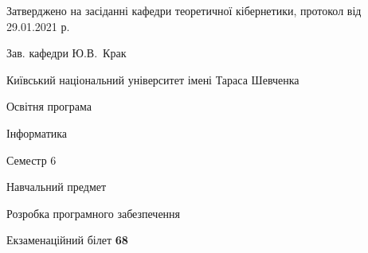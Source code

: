 \documentclass[10pt, ukrainian]{article}
\begin{document}
{\vspace{5mm}\smallskip \begin {small} Затверджено на засіданні кафедри теоретичної кібернетики, протокол  від   29.01.2021 р.\par\smallskip\smallskip
{\parbox {6.5 cm}{Зав. кафедри \dotfill Ю.В.~Крак}} \end{small}}
\newpage

{{\begin {small}\par
{ \center  Київський національний університет імені Тараса Шевченка \par}
{\parbox {5 cm}{Освітня програма \hfill}{\parbox {7 cm}{Інформатика \hfill}}\parbox {6 cm}{\hfill Семестр 6}}\par
{\parbox {5 cm} {Навчальний предмет \hfill}\parbox {7 cm}{Розробка програмного забезпечення \hfill}\parbox {6cm}{\hfill}\par}\vspace{-7pt} \end{small}}{\center Екзаменаційний білет \No \textbf
{ 68 }\par}}
\end{document}
